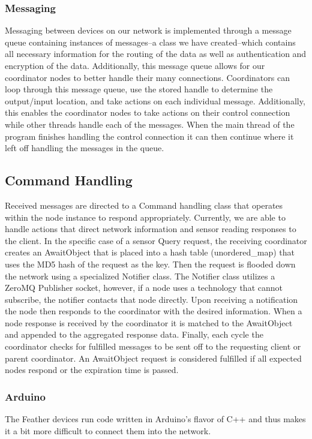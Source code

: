 \documentclass[tikz,a4paper,titlepage]{article}
\begin{document}
\subsubsection{Messaging}
Messaging between devices on our network is implemented through a message queue containing instances of messages--a class we have created--which contains all necessary information for the routing of the data as well as authentication and encryption of the data. Additionally, this message queue allows for our coordinator nodes to better handle their many connections. Coordinators can loop through this message queue, use the stored handle to determine the output/input location, and take actions on each individual message. Additionally, this enables the coordinator nodes to take actions on their control connection while other threads handle each of the messages. When the main thread of the program finishes handling the control connection it can then continue where it left off handling the messages in the queue.

\subsection{Command Handling}
Received messages are directed to a Command handling class that operates within the node instance to respond appropriately. Currently, we are able to handle actions that direct network information and sensor reading responses to the client. In the specific case of a sensor Query request, the receiving coordinator creates an AwaitObject that is placed into a hash table (unordered\_map) that uses the MD5 hash of the request as the key. Then the request is flooded down the network using a specialized Notifier class. The Notifier class utilizes a ZeroMQ Publisher socket, however, if a node uses a technology that cannot subscribe, the notifier contacts that node directly. Upon receiving a notification the node then responds to the coordinator with the desired information. When a node response is received by the coordinator it is matched to the AwaitObject and appended to the aggregated response data. Finally, each cycle the coordinator checks for fulfilled messages to be sent off to the requesting client or parent coordinator. An AwaitObject request is considered fulfilled if all expected nodes respond or the expiration time is passed. 

\subsubsection{Arduino}
The Feather devices run code written in Arduino's flavor of C++ and thus makes it a bit more difficult to connect them into the network.
\end{document}
